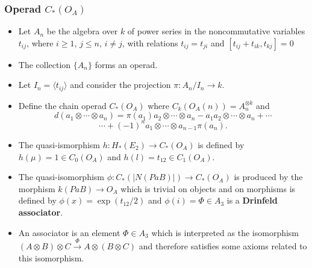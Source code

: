 \documentclass{beamer}
\theoremstyle{definition}
\newcommand{\Q}{\mathbb{Q}}
\providecommand{\gene}[1]{\langle{#1}\rangle}
\begin{document}
 
\begin{frame}
	\frametitle{Operad $C_*(O_A)$}
	\begin{itemize}
		\item<1-> Let $A_n$ be the algebra over $k$ of power series in the noncommutative variables $t_{ij}$, where $i\geq 1$, $j\leq n$, $i\neq j$, with relations $t_{ij}=t_{ji}$ and $[t_{ij}+t_{ik},t_{kj}]=0$
		\item<2-> The collection $\{A_n\}$ forms an operad. 
		\item<3-> Let $I_n=\gene{t_{ij}}$ and consider the projection $\pi:A_n/I_n\to k$. 
	\end{itemize}
\end{frame}
\begin{frame}
	\begin{itemize}
		\item<1-> %
		Define the chain operad $C_*(O_A)$ where $C_k(O_A(n))=A_n^{\otimes k}$ and
		$$
		d(a_1\otimes\cdots\otimes a_n)=\pi(a_1)a_2\otimes\cdots\otimes a_n-a_1a_2\otimes \cdots\otimes a_n+\cdots$$ $$\cdots+(-1)^{n}a_1\otimes\cdots\otimes a_{n-1}\pi(a_n).$$ %
		
		\item<2-> The quasi-ismorphism $h:H_*(E_2)\to C_*(O_A)$ is defined by $h(\mu)=1\in C_0(O_A)$ and $h(l)=t_{12}\in C_1(O_A)$. %
		\item<3-> The quasi-isomorphism $\phi:C_*(|N(PaB)|)\to C_*(O_A)$ is produced by the morphism $k(PaB)\to O_A$ which is trivial on objects and on morphisms is defined by $\phi(x)=\exp(t_{12}/2)$ and $\phi(i)=\Phi\in A_3$ is a \textbf{Drinfeld associator}.  %
		\item<4-> An associator is an element $\Phi\in A_3$ which is interpreted as the isomorphism $(A\otimes B)\otimes C\xrightarrow{\Phi} A\otimes (B\otimes C)$ and therefore satisfies some axioms related to this isomorphism. %
	\end{itemize}
\end{frame}
\end{document}

